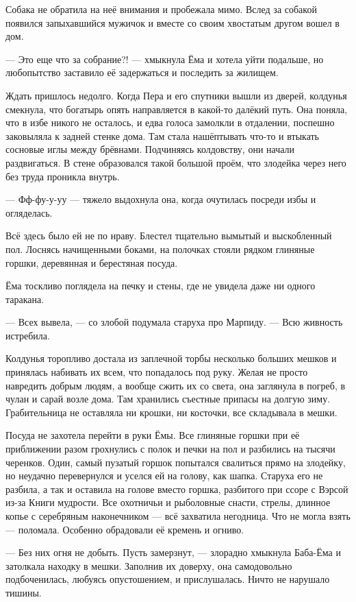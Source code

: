 \documentclass[12pt, a4paper, openany]{book}
\begin{document}
	Собака не обратила на неё внимания и пробежала мимо. Вслед за собакой появился запыхавшийся мужичок и вместе со своим хвостатым другом вошел в дом.
	
	— Это еще что за собрание?! — хмыкнула Ёма и хотела уйти подальше, но любопытство заставило её задержаться и последить за жилищем.
	
	Ждать пришлось недолго. Когда Пера и его спутники вышли из дверей, колдунья смекнула, что богатырь опять направляется в какой-то далёкий путь. Она поняла, что в избе никого не осталось, и едва голоса замолкли в отдалении, поспешно заковыляла к задней стенке дома. Там стала нашёптывать что-то и втыкать сосновые иглы между брёвнами. Подчиняясь колдовству, они начали раздвигаться. В стене образовался такой большой проём, что злодейка через него без труда проникла внутрь.
	
	— Фф-фу-у-уу — тяжело выдохнула она, когда очутилась посреди избы и огляделась.
	
	Всё здесь было ей не по нраву. Блестел тщательно вымытый и выскобленный пол. Лоснясь начищенными боками, на полочках стояли рядком глиняные горшки, деревянная и берестяная посуда.
	
	Ёма тоскливо поглядела на печку и стены, где не увидела даже ни одного таракана.
	
	— Всех вывела, — со злобой подумала старуха про Марпиду. — Всю живность истребила.
	
	Колдунья торопливо достала из заплечной торбы несколько больших мешков и принялась набивать их всем, что попадалось под руку. Желая не просто навредить добрым людям, а вообще сжить их со света, она заглянула в погреб, в чулан и сарай возле дома. Там хранились съестные припасы на долгую зиму. Грабительница не оставляла ни крошки, ни косточки, все складывала в мешки.
	
	Посуда не захотела перейти в руки Ёмы. Все глиняные горшки при её приближении разом грохнулись с полок и печки на пол и разбились на тысячи черенков. Один, самый пузатый горшок попытался свалиться прямо на злодейку, но неудачно перевернулся и уселся ей на голову, как шапка. Старуха его не разбила, а так и оставила на голове вместо горшка, разбитого при ссоре с Вэрсой из-за Книги мудрости. Все охотничьи и рыболовные снасти, стрелы, длинное копье с серебряным наконечником — всё захватила негодница. Что не могла взять — поломала. Особенно обрадовали её кремень и огниво.
	
	— Без них огня не добыть. Пусть замерзнут, — злорадно хмыкнула Баба-Ёма и затолкала находку в мешки. Заполнив их доверху, она самодовольно подбоченилась, любуясь опустошением, и прислушалась. Ничто не нарушало тишины.
	
\end{document}
